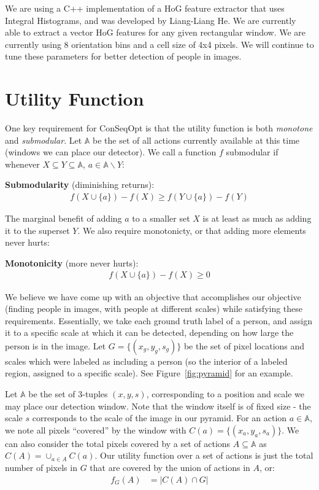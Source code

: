 \documentclass[11pt]{article}
\newcommand{\allactionset}{\mathbb{A}}
\begin{document}
We are using a C++ implementation of a HoG feature extractor that uses Integral Histograms, and was developed by Liang-Liang He. We are currently able to extract a vector HoG features for any given rectangular window. We are currently using 8 orientation bins and a cell size of 4x4 pixels. We will continue to tune these parameters for better detection of people in images.


\section{Utility Function}
One key requirement for ConSeqOpt is that the utility function is both \emph{monotone} and \emph{submodular}. Let $\allactionset$ be the set of all actions currently available at this time (windows we can place our detector). We call a function $f$ submodular if whenever $X \subseteq Y \subseteq \allactionset$, $a \in \allactionset \backslash Y$:

\textbf{Submodularity} (diminishing returns):
\begin{align*}
  f(X \cup \{a\}) - f(X) \geq f(Y \cup \{a\}) - f(Y)
\end{align*}

The marginal benefit of adding $a$ to a smaller set $X$ is at least as much as adding it to the superset $Y$. We also require monotonicty, or that adding more elements never hurts:

\textbf{Monotonicity} (more never hurts):
\begin{align*}
f(X \cup \{a\}) - f(X) \geq 0
\end{align*}

We believe we have come up with an objective that accomplishes our objective (finding people in images, with people at different scales) while satisfying these requirements. Essentially, we take each ground truth label of a person, and assign it to a specific scale at which it can be detected, depending on how large the person is in the image. Let $G = \{ (x_g,y_g,s_g)\}$ be the set of pixel locations and scales which were labeled as including a person (so the interior of a labeled region, assigned to a specific scale). See Figure~\ref{fig:pyramid} for an example.

Let $\allactionset$ be the set of 3-tuples $(x,y,s)$, corresponding to a position and scale we may place our detection window. Note that the window itself is of fixed size - the scale $s$ corresponds to the scale of the image in our pyramid. For an action $a \in \allactionset$, we note all pixels ``covered'' by the window with $C(a) = \{(x_a, y_a, s_a)\}$. We can also consider the total pixels covered by a set of actions $A \subseteq \allactionset$ as $C(A) = \cup_{a \in A} C(a)$. Our utility function over a set of actions is just the total number of pixels in $G$ that are covered by the union of actions in $A$, or:
\begin{align*}
  f_G(A) &= | C(A) \cap G|
\end{align*}
\end{document}
